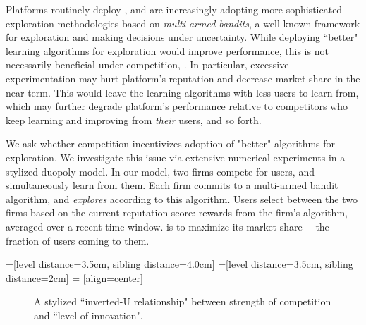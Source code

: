 \documentclass[letterpaper]{article}
\theoremstyle{definition}
\begin{document}
Platforms routinely deploy , and are increasingly adopting  more sophisticated exploration methodologies based on \emph{multi-armed bandits}, a well-known framework for exploration and making decisions under uncertainty. While deploying ``better" learning algorithms for exploration would improve performance, this is not necessarily beneficial under competition, . In particular, excessive experimentation may hurt platform's reputation and decrease market share in the near term. This would leave the learning algorithms with less users to learn from, which may further degrade platform's performance relative to competitors who keep learning and improving from \emph{their} users, and so forth.

We ask whether competition incentivizes adoption of "better" algorithms for exploration. We investigate this issue via extensive numerical experiments in a stylized duopoly model. In our model, two firms compete for users, and simultaneously learn from them. Each firm commits to a multi-armed bandit algorithm, and \emph{explores} according to this algorithm. Users select between the two firms based on the current reputation score: rewards from the firm's algorithm, averaged over a recent time window.  is to maximize its market share ---the fraction of users coming to them.

=[level distance=3.5cm, sibling distance=4.0cm]
=[level distance=3.5cm, sibling distance=2cm]
 = [align=center]

\begin{figure}
\begin{center}
 \caption{A stylized ``inverted-U relationship" between strength of competition and ``level of innovation".}
\label{fig:inverted-U}
\end{center}
\end{figure}
\end{document}
